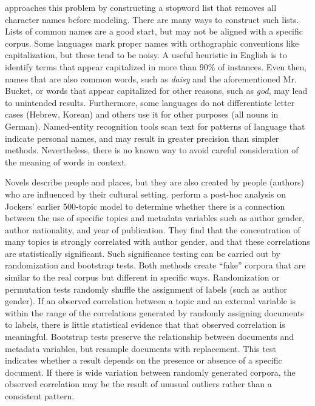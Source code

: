 \cite{jockers-13} approaches this problem by constructing a stopword list that removes all character names before modeling.
There are many ways to construct such lists.
Lists of common names are a good start, but may not be aligned with a specific corpus.
Some languages mark proper names with orthographic conventions like capitalization, but these tend to be noisy.
A useful heuristic in English is to identify terms that appear capitalized in more than 90\% of instances.
Even then, names that are also common words, such as {\em daisy} and the aforementioned Mr. Bucket, or words that appear capitalized for other reasons, such as {\em god}, may lead to unintended results.
Furthermore, some languages do not differentiate letter cases (Hebrew, Korean) and others use it for other purposes (all nouns in German).
Named-entity recognition tools scan text for patterns of language that indicate personal names, and may result in greater precision than simpler methods.
Nevertheless, there is no known way to avoid careful consideration of the meaning of words in context.

Novels describe people and places, but they are also created by people (authors) who are influenced by their cultural setting.
\cite{jockers-13b} perform a post-hoc analysis on Jockers' earlier 500-topic model to determine whether there is a connection between the use of specific topics and metadata variables such as author gender, author nationality, and year of publication.
They find that the concentration of many topics is strongly correlated with author gender, and that these correlations are statistically significant.
Such significance testing can be carried out by randomization and bootstrap tests. 
Both methods create ``fake'' corpora that are similar to the real corpus but different in specific ways. 
Randomization or permutation tests randomly shuffle the assignment of labels (such as author gender). If an observed correlation between a topic and an external variable is within the range of the correlations generated by randomly assigning documents to labels, there is little statistical evidence that that observed correlation is meaningful.
Bootstrap tests preserve the relationship between documents and metadata variables, but resample documents with replacement.
This test indicates whether a result depends on the presence or absence of a specific document.
If there is wide variation between randomly generated corpora, the observed correlation may be the result of unusual outliers rather than a consistent pattern.

